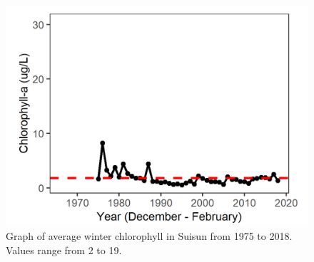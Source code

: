 \documentclass[
]{book}
\begin{document}
\begin{panel-grid}
\begin{columns-nocenter}
\begin{column800}
\begin{expand}
\end{expand}

\end{column800}

\begin{column40}

~

\end{column40}

\begin{column800}

\begin{expand}

\begin{figure}
\includegraphics[width=15.25in]{figures/chla_sswinter} \caption{Graph of average winter chlorophyll in Suisun from 1975 to 2018. Values range from 2 to 19.}\label{fig:unnamed-chunk-159}
\end{figure}

\end{expand}

\end{column800}

\begin{column40}

~

\end{column40}

\begin{column800}

\begin{expand}


\end{expand}
\end{column800}
\end{columns-nocenter}
\end{panel-grid}
\end{document}
